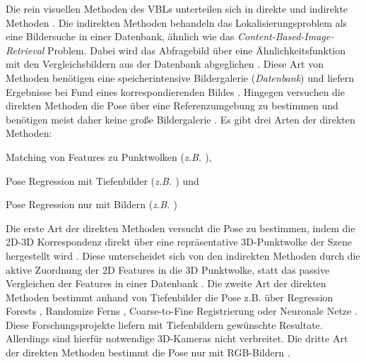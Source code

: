 Die rein visuellen Methoden des VBLs unterteilen sich in direkte und indirekte Methoden \cite{lowryVisualPlaceRecognition2016}. Die indirekten Methoden behandeln das Lokalisierungsproblem als eine Bildersuche in einer Datenbank, ähnlich wie das \textit{Content-Based-Image-Retrieval} \cite{lewContentbasedMultimediaInformation2006} Problem. Dabei wird das Abfragebild über eine Ähnlichkeitsfunktion mit den Vergleichsbildern aus der Datenbank abgeglichen \cite{zhangImageBasedLocalization2006}. Diese Art von Methoden benötigen eine speicherintensive Bildergalerie (\textit{Datenbank}) und liefern Ergebnisse bei Fund eines korrespondierenden Bildes \cite{lowryVisualPlaceRecognition2016}. Hingegen versuchen die direkten Methoden die Pose über eine Referenzumgebung zu bestimmen und benötigen meist daher keine große Bildergalerie \cite{piascoSurveyVisualBasedLocalization2018}. Es gibt drei Arten der direkten Methoden: 
\begin{enumerate*}[label=\arabic*)]
	\item Matching von Features zu Punktwolken (\textit{z.B. \cite{liWorldwidePoseEstimation2012}}),
	\item Pose Regression mit Tiefenbilder (\textit{z.B. \cite{shottonSceneCoordinateRegression2013}}) und
	\item Pose Regression nur mit Bildern (\textit{z.B. \cite{kendallPoseNetConvolutionalNetwork2015}})
\end{enumerate*}

Die erste Art der direkten Methoden versucht die Pose zu bestimmen, indem die 2D-3D Korrespondenz direkt über eine repräsentative 3D-Punktwolke der Szene hergestellt wird \cite{piascoSurveyVisualBasedLocalization2018}. Diese unterscheidet sich von den indirekten Methoden durch die aktive Zuordnung der 2D Features in die 3D Punktwolke, statt das passive Vergleichen der Features in einer Datenbank \cite{irscharaStructurefrommotionPointClouds2009}. Die zweite Art der direkten Methoden bestimmt anhand von Tiefenbilder die Pose z.B. über Regression Forests \cite{shottonSceneCoordinateRegression2013}, Randomize Ferns \cite{glockerRealTimeRGBDCamera2015}, Coarse-to-Fine Registrierung \cite{santosMappingIndoorSpaces2016} oder Neuronale Netze \cite{massicetiRandomForestsNeural2017}. Diese Forschungsprojekte liefern mit Tiefenbildern gewünschte Resultate. Allerdings sind hierfür notwendige 3D-Kameras nicht verbreitet. Die dritte Art der direkten Methoden bestimmt die Pose nur mit RGB-Bildern \cite{kendallPoseNetConvolutionalNetwork2015}.

